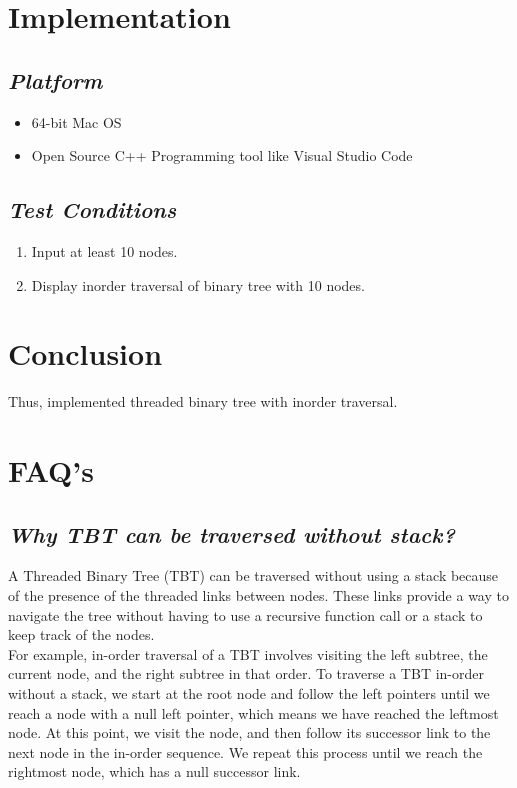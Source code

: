 \documentclass{article}
\begin{document}
\section{\textbf{Implementation}}
\subsection{\textbf{\textit{Platform}}}
\begin{itemize}
	\item 64-bit Mac OS
	\item Open Source C++ Programming tool like Visual Studio Code
\end{itemize}
\subsection{\textbf{\textit{Test Conditions}}}
\begin{enumerate}
	\item Input at least 10 nodes.
	\item Display inorder traversal of binary tree with 10 nodes.
\end{enumerate}
\section{\textbf{Conclusion}}
Thus, implemented threaded binary tree with inorder traversal.
\section{\textbf{FAQ's}}
\subsection{\textit{Why TBT can be traversed without stack?}}
A Threaded Binary Tree (TBT) can be traversed without using a stack because of the presence of the threaded links between nodes. These links provide a way to navigate the tree without having to use a recursive function call or a stack to keep track of the nodes.\\

For example, in-order traversal of a TBT involves visiting the left subtree, the current node, and the right subtree in that order. To traverse a TBT in-order without a stack, we start at the root node and follow the left pointers until we reach a node with a null left pointer, which means we have reached the leftmost node. At this point, we visit the node, and then follow its successor link to the next node in the in-order sequence. We repeat this process until we reach the rightmost node, which has a null successor link.\\
\end{document}

